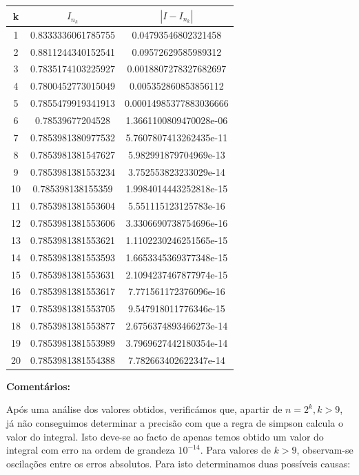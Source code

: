 \documentclass{article}
\begin{document}
\begin{center}
\begin{tabular}{c|c|c}
  k & $I_{n_{k}}$ & $|I-I_{n_{k}}|$ \\
  \hline
  1 & 0.8333336061785755 & 0.04793546802321458 \\
  2 & 0.8811244340152541 & 0.09572629585989312 \\
  3 & 0.7835174103225927 & 0.0018807278327682697 \\
  4 & 0.7800452773015049 & 0.005352860853856112 \\
  5 & 0.7855479919341913 & 0.00014985377883036666 \\
  6 & 0.78539677204528 & 1.3661100809470028e-06 \\
  7 & 0.7853981380977532 & 5.7607807413262435e-11 \\
  8 & 0.7853981381547627 & 5.982991879704969e-13 \\
  9 & 0.7853981381553234 & 3.752553823233029e-14 \\
  10 & 0.785398138155359 & 1.9984014443252818e-15 \\
  11 & 0.7853981381553604 & 5.551115123125783e-16 \\
  12 & 0.7853981381553606 & 3.3306690738754696e-16 \\
  13 & 0.7853981381553621 & 1.1102230246251565e-15 \\
  14 & 0.7853981381553593 & 1.6653345369377348e-15 \\
  15 & 0.7853981381553631 & 2.1094237467877974e-15 \\
  16 & 0.7853981381553617 & 7.771561172376096e-16 \\
  17 & 0.7853981381553705 & 9.547918011776346e-15 \\
  18 & 0.7853981381553877 & 2.6756374893466273e-14 \\
  19 & 0.7853981381553989 & 3.7969627442180354e-14 \\
  20 & 0.7853981381554388 & 7.782663402622347e-14 \\
  \hline
\end{tabular}
\end{center}
\par
\textbf{Comentários:}\par
Após uma análise dos valores obtidos, verificámos que, apartir de $n=2^k, k>9$, já não conseguimos determinar a precisão com que a regra de simpson calcula o valor do integral. Isto deve-se ao facto de apenas temos obtido um valor do integral com erro na ordem de grandeza $10^{-14}$. Para valores de $k>9$, observam-se oscilações entre os erros absolutos. Para isto determinamos duas possíveis causas:
\end{document}
